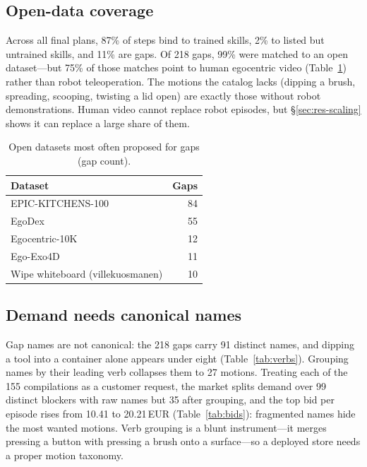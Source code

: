 \documentclass[10pt,twocolumn,letterpaper]{article}
\begin{document}
\subsection{Open-data coverage}\label{sec:res-coverage}
Across all final plans, 87\% of steps bind to trained skills, 2\% to listed but untrained skills, and 11\% are gaps.
Of 218 gaps, 99\% were matched to an open dataset---but 75\% of those matches point to human egocentric video
(Table~\ref{tab:datasets}) rather than robot teleoperation. The motions the catalog lacks (dipping a brush, spreading,
scooping, twisting a lid open) are exactly those without robot demonstrations. Human video cannot replace robot
episodes, but \S\ref{sec:res-scaling} shows it can replace a large share of them.

\begin{table}[t]
\centering\small
\caption{Open datasets most often proposed for gaps (gap count).}
\label{tab:datasets}
\begin{tabular}{@{}lr@{}}
\toprule
Dataset & Gaps\\
\midrule
EPIC-KITCHENS-100 & 84\\
EgoDex & 55\\
Egocentric-10K & 12\\
Ego-Exo4D & 11\\
Wipe whiteboard (villekuosmanen) & 10\\
\bottomrule
\end{tabular}
\end{table}

\subsection{Demand needs canonical names}
Gap names are not canonical: the 218 gaps carry 91 distinct names, and dipping a tool into a container alone appears
under eight (Table~\ref{tab:verbs}). Grouping names by their leading verb collapses them to 27 motions. Treating each
of the 155 compilations as a customer request, the market splits demand over 99 distinct blockers with raw names but 35
after grouping, and the top bid per episode rises from 10.41 to 20.21\,EUR (Table~\ref{tab:bids}): fragmented names hide
the most wanted motions. Verb grouping is a blunt instrument---it merges pressing a button with pressing a brush onto a
surface---so a deployed store needs a proper motion taxonomy.
\end{document}
